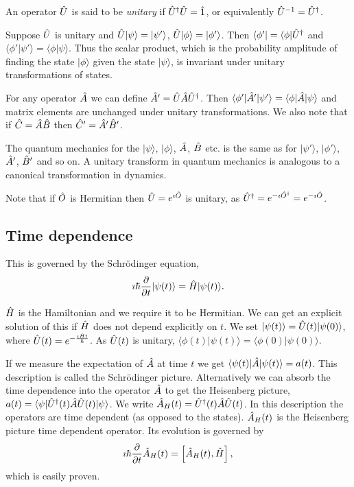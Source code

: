 \documentclass{notes}
\newcommand{\bra}[1]{\langle#1|}
\newcommand{\ket}[1]{|#1\rangle}
\newcommand{\scp}[2]{\langle#1|#2\rangle}
\newcommand{\com}[2]{\left[#1,#2\right]}
\begin{document}
An operator $\Hat{U}$ is said to be \emph{unitary} if
$\Hat{U}^\dag \Hat{U} = \Hat{1}$, or equivalently $\Hat{U}^{-1}
= \Hat{U}^\dag$.

Suppose $\Hat{U}$ is unitary and $\Hat{U} \ket{\psi} = \ket{\psi'}$,
$\Hat{U} \ket{\phi} = \ket{\phi'}$.  Then $\bra{\phi'} = \bra{\phi}
\Hat{U}^\dag$ and $\scp{\phi'}{\psi'} = \scp{\phi}{\psi}$.  Thus the
scalar product, which is the probability amplitude of finding the state
$\ket{\phi}$ given the state $\ket{\psi}$, is invariant under unitary
transformations of states.

For any operator $\Hat{A}$ we can define $\Hat{A}' = \Hat{U} \Hat{A}
\Hat{U}^\dag$.  Then $\bra{\phi'} \Hat{A}' \ket{\psi'}
= \bra{\phi} \Hat{A} \ket{\psi}$ and matrix elements are unchanged under
unitary transformations. We also note that if $\Hat{C} = \Hat{A} \Hat{B}$
then $\Hat{C}' = \Hat{A}' \Hat{B}'$.

The quantum mechanics for the $\ket{\psi}$, $\ket{\phi}$, $\Hat{A}$,
$\Hat{B}$ etc. is the same as for $\ket{\psi'}$, $\ket{\phi'}$, $\Hat{A}'$,
$\Hat{B}'$ and so on.  A unitary transform in quantum mechanics is analogous
to a canonical transformation in dynamics.

Note that if $\Hat{O}$ is Hermitian then $\Hat{U} = e^{\imath \Hat{O}}$
is unitary, as $\Hat{U}^\dag = e^{-\imath \Hat{O}^\dag} = e^{-\imath \Hat{O}}$.

\subsection{Time dependence}

This is governed by the Schr\"odinger equation,
\[
\imath \hbar \pd{}{t} \ket{\psi(t)} = \Hat{H} \ket{\psi(t)}.
\]

$\Hat{H}$ is the Hamiltonian and we require it to be Hermitian.  We can
get an explicit solution of this if $\Hat{H}$ does not depend explicitly
on $t$.  We set $\ket{\psi(t)} = \Hat{U}(t) \ket{\psi(0)}$, where
$\Hat{U}(t) = e^{- \frac{\imath \Hat{H} t}{\hbar}}$.  As $\Hat{U}(t)$ is
unitary, $\scp{\phi(t)}{\psi(t)} = \scp{\phi(0)}{\psi(0)}$.

If we measure the expectation of $\Hat{A}$ at time $t$ we get
$\bra{\psi(t)}\Hat{A} \ket{\psi(t)} = a(t)$.  This description is called the
Schr\"odinger picture.  Alternatively we can absorb the time dependence
into the operator $\Hat{A}$ to get the Heisenberg picture,
$a(t) = \bra{\psi} \Hat{U}^\dag (t) \Hat{A} \Hat{U}(t) \ket{\psi}$.  We
write $\Hat{A}_H(t) = \Hat{U}^\dag (t) \Hat{A} \Hat{U}(t)$.  In this
description the operators are time dependent (as opposed to the states).
$\Hat{A}_H(t)$ is the Heisenberg picture time dependent operator.  Its
evolution is governed by
\[
\imath \hbar \pd{}{t} \Hat{A}_H(t) = \com{\Hat{A}_H(t)}{\Hat{H}},
\]
which is easily proven.
\end{document}
